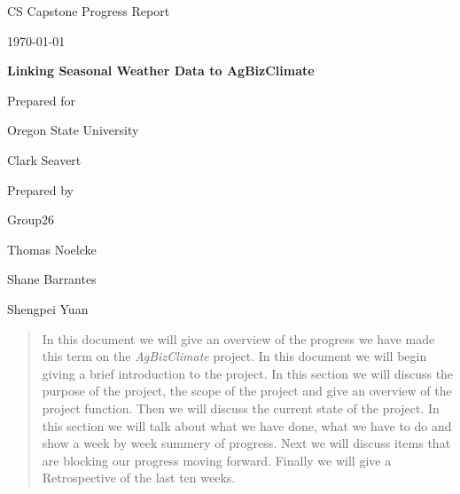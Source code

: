 \documentclass[onecolumn, draftclsnofoot,10pt, compsoc]{article}
\def \CapstoneTeamName{AgBizClimate}
\def \CapstoneTeamNumber{26}
\def \GroupMemberOne{	Thomas Noelcke}
\def \GroupMemberTwo{	Shane Barrantes}
\def \GroupMemberThree{	Shengpei Yuan}
\def \CapstoneProjectName{ Linking Seasonal Weather Data to AgBizClimate\texttrademark}
\def \CapstoneSponsorCompany{ Oregon State University}
\def \CapstoneSponsorPerson{ Clark Seavert}
\def \DocType{		%
				Progress Report
				}
\newcommand{\NameSigPair}[1]{\par
\makebox[2.75in][r]{#1} \hfil 	\makebox[3.25in]{\makebox[2.25in]{\hrulefill} \hfill		\makebox[.75in]{\hrulefill}}
\par\vspace{-12pt} \textit{\tiny\noindent
\makebox[2.75in]{} \hfil		\makebox[3.25in]{\makebox[2.25in][r]{Signature} \hfill	\makebox[.75in][r]{Date}}}}
\renewcommand{\NameSigPair}[1]{#1}
\begin{document}
\begin{titlepage}
    \begin{singlespace}
        \hfill
        \par\vspace{.2in}
        \centering
        \scshape{
            \huge CS Capstone \DocType \par
            {\large\today}\par
            \vspace{.5in}
            \textbf{\Huge\CapstoneProjectName}\par
            \vfill
            {\large Prepared for}\par
            \Huge \CapstoneSponsorCompany\par
            \vspace{5pt}
            {\Large\NameSigPair{\CapstoneSponsorPerson}\par}
            {\large Prepared by }\par
            Group\CapstoneTeamNumber\par
            \vspace{5pt}
            {\Large
                \NameSigPair{\GroupMemberOne}\par
                \NameSigPair{\GroupMemberTwo}\par
                \NameSigPair{\GroupMemberThree}\par
            }
            \vspace{20pt}
        }
        \begin{abstract}
					In this document we will give an overview of the progress we have made this term on the \textit{AgBizClimate} project. In this document we will begin giving a brief introduction to the project. In this section we will discuss the purpose of the project, the scope of the project and give an overview of the project function. Then we will discuss the current state of the project. In this section we will talk about what we have done, what we have to do and show a week by week summery of progress. Next we will discuss items that are blocking our progress moving forward. Finally we will give a Retrospective of the last ten weeks.\\
        \end{abstract}
    \end{singlespace}
\end{titlepage}
\newpage
{}
\tableofcontents
\listoffigures 
\newpage
\clearpage
\end{document}
